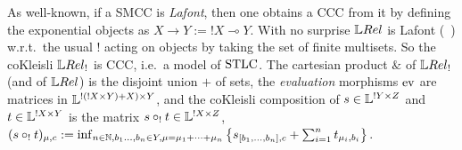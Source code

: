 
\begin{comment}

In order to interpret the full $\STLC$, we need a Cartesian closed category (CCC).
It is well-known \cite{Mellies2009} that it is always possible to construct a CCC by taking the \emph{co-Kleisli} $\C C_!$ of a so-called \emph{Lafont category} $\C C$.
A SMCC is Lafont when it has finite products and it is equipped with a comonad $!$ (its \emph{Lafont exponential}) which, at level of objects, sends $X$ to an object $!X$ being the free commutative comonoid on $X$.
Such objects $!X$ represent the \emph{bang} connective of linear logic, granting infinite duplications via the infinite product $X^0\otimes X\otimes X^2\otimes X^3\otimes\cdots$, each factor representing a possible number of duplications.
It is well-known that, under mild conditions satisfied by $\QREL$, one can explicit this idea via the fact that the map $X\mapsto \finMS{X}$ (where $\finMS{X}$ is the set of finite multi-sets on $X$) lifts to a functor $!:\QREL\to\QREL$ which is a Lafont-exponential comonad.
Specializing [Corollary III.6, \cite{Manzo2013}] to our case, we have:

\begin{proposition}
 $\LREL$ is Lafont.
\end{proposition}

\end{comment}

As well-known, if a SMCC is \emph{Lafont}, then one obtains a CCC from it by defining the exponential objects as $X\to Y:=!X \multimap Y$.
With no surprise $\LREL$ is Lafont (~\cite[Corollary III.6]{Manzo2013}) %
w.r.t.\ the usual $!$ acting on objects by taking the set of finite multisets.
So the coKleisli $\LREL_!$ is CCC, i.e.\ a model of $\mathrm{STLC}$.
The cartesian product $\&$ of $\LREL_!$ (and of $\LREL$) is the disjoint union $+$ of sets, the \emph{evaluation} morphisms $\mathrm{ev}$ are matrices in $\mathbb{L}^{!(!X\times Y)+X)\times Y}$, and the coKleisli composition of $s\in\mathbb{L}^{!Y\times Z}$ and $t\in\mathbb{L}^{!X\times Y}$ is the matrix $s\circ_! t\in\mathbb{L}^{!X\times Z}$, $(s\circ_! t)_{\mu,c}:=
\inf_{n\in\mathbb{N}, b_1\dots,b_n\in Y, \mu = \mu_1+\cdots +\mu_n}
 \left\{s_{[b_1,\dots,b_n],c} + \sum_{i=1}^n t_{\mu_i,b_i}\right\}$.

